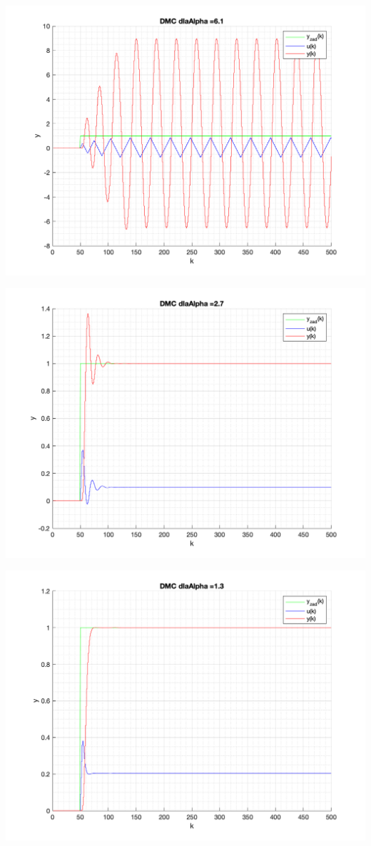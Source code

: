 \documentclass[a4paper, 11pt]{article}
\begin{document}
\begin{enumerate}
 \includegraphics[width=\linewidth]{./ModelsDodatkowe_Alpha/P4_DMC_Alpha_6_1_png.png} 
 
 \includegraphics[width=\linewidth]{./ModelsDodatkowe_Alpha/P4_DMC_Alpha_2_7_png.png} 
 
 \includegraphics[width=\linewidth]{./ModelsDodatkowe_Alpha/P4_DMC_Alpha_1_3_png.png} 
 

\end{enumerate}
\end{document}
